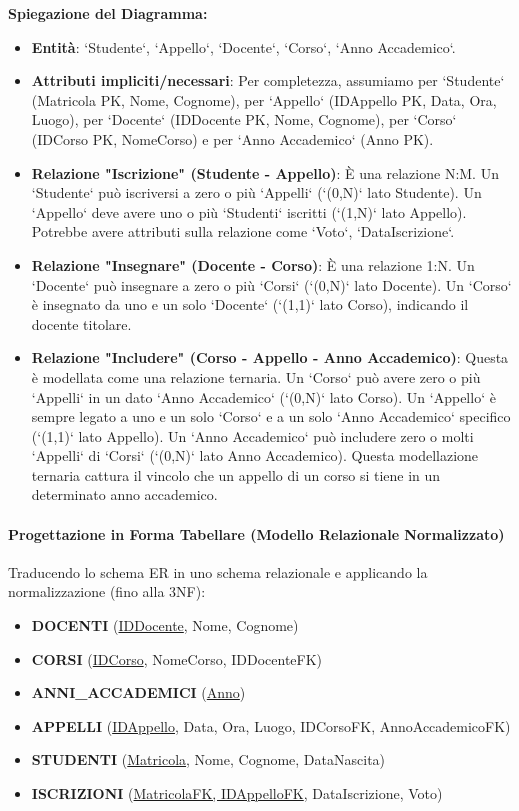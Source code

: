 \textbf{Spiegazione del Diagramma:}
\begin{itemize}
    \item \textbf{Entità}: `Studente`, `Appello`, `Docente`, `Corso`, `Anno Accademico`.
    \item \textbf{Attributi impliciti/necessari}: Per completezza, assumiamo per `Studente` (Matricola PK, Nome, Cognome), per `Appello` (IDAppello PK, Data, Ora, Luogo), per `Docente` (IDDocente PK, Nome, Cognome), per `Corso` (IDCorso PK, NomeCorso) e per `Anno Accademico` (Anno PK).
    \item \textbf{Relazione "Iscrizione" (Studente - Appello)}: È una relazione N:M. Un `Studente` può iscriversi a zero o più `Appelli` (`(0,N)` lato Studente). Un `Appello` deve avere uno o più `Studenti` iscritti (`(1,N)` lato Appello). Potrebbe avere attributi sulla relazione come `Voto`, `DataIscrizione`.
    \item \textbf{Relazione "Insegnare" (Docente - Corso)}: È una relazione 1:N. Un `Docente` può insegnare a zero o più `Corsi` (`(0,N)` lato Docente). Un `Corso` è insegnato da uno e un solo `Docente` (`(1,1)` lato Corso), indicando il docente titolare.
    \item \textbf{Relazione "Includere" (Corso - Appello - Anno Accademico)}: Questa è modellata come una relazione ternaria. Un `Corso` può avere zero o più `Appelli` in un dato `Anno Accademico` (`(0,N)` lato Corso). Un `Appello` è sempre legato a uno e un solo `Corso` e a un solo `Anno Accademico` specifico (`(1,1)` lato Appello). Un `Anno Accademico` può includere zero o molti `Appelli` di `Corsi` (`(0,N)` lato Anno Accademico). Questa modellazione ternaria cattura il vincolo che un appello di un corso si tiene in un determinato anno accademico.
\end{itemize}

\paragraph{Progettazione in Forma Tabellare (Modello Relazionale Normalizzato)}
Traducendo lo schema ER in uno schema relazionale e applicando la normalizzazione (fino alla 3NF):

\begin{itemize}
    \item \textbf{DOCENTI} (\underline{IDDocente}, Nome, Cognome)
    \item \textbf{CORSI} (\underline{IDCorso}, NomeCorso, IDDocenteFK)
    \item \textbf{ANNI\_ACCADEMICI} (\underline{Anno})
    \item \textbf{APPELLI} (\underline{IDAppello}, Data, Ora, Luogo, IDCorsoFK, AnnoAccademicoFK)
    \item \textbf{STUDENTI} (\underline{Matricola}, Nome, Cognome, DataNascita)
    \item \textbf{ISCRIZIONI} (\underline{MatricolaFK, IDAppelloFK}, DataIscrizione, Voto)
\end{itemize}

